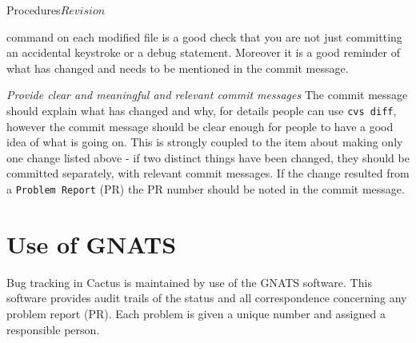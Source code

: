 \begin{cactuspart}{2}{Procedures}{}{$Revision$}
\begin{Lentry}
command on each modified file is a good check that you are not just
committing an accidental keystroke or a debug statement.  Moreover it
is a good reminder of what has changed and needs to be mentioned in
the commit message.
\item[{\em Provide clear and meaningful and relevant commit messages}]
The commit message should explain what has changed and why, for
details people can use {\tt \verb.cvs diff.}, however the commit
message should be clear enough for people to have a good idea of what
is going on.  This is strongly coupled to the item about making only
one change listed above - if two distinct things have been changed,
they should be committed separately, with relevant commit messages.
If the change resulted from a {\tt Problem Report} (PR) the PR number
should be noted in the commit message.
\end{Lentry}


\chapter{Use of GNATS}

Bug tracking in Cactus is maintained by use of the GNATS software.
This software provides audit trails of the status and all
correspondence concerning any problem report (PR).  Each problem is
given a unique number and assigned a responsible person.


\end{cactuspart}
